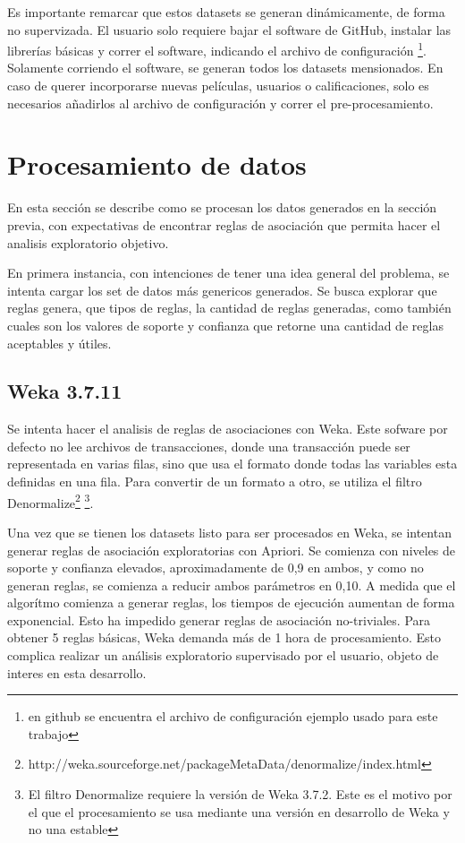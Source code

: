 \documentclass[journal]{IEEEtran}
\begin{document}
Es importante remarcar que estos datasets se generan dinámicamente, de forma 
no supervizada. El usuario solo requiere bajar el software de GitHub, instalar
las librerías básicas y correr el software, indicando el archivo de configuración
\footnote{en github se encuentra el archivo de configuración ejemplo usado para este trabajo}. 
Solamente corriendo el software, se generan todos los datasets mensionados.  En caso de
querer incorporarse nuevas películas, usuarios o calificaciones, solo es necesarios
añadirlos al archivo de configuración y correr el pre-procesamiento.





\section{Procesamiento de datos}
En esta sección se describe como se procesan los datos generados en la sección
previa, con expectativas de encontrar reglas de asociación que permita hacer el
analisis exploratorio objetivo.

En primera instancia, con intenciones de tener una idea general del problema,
se intenta cargar los set de datos más genericos generados. Se busca explorar
que reglas genera, que tipos de reglas, la cantidad de reglas generadas, como
también cuales son los valores de soporte y confianza que retorne una cantidad
de reglas aceptables y útiles. 

\subsection{Weka 3.7.11}
Se intenta hacer el analisis de reglas de asociaciones con Weka. Este sofware por defecto
no lee archivos de transacciones, donde una transacción puede ser representada en varias filas,
 sino que usa el formato donde todas las variables esta definidas en una fila. Para convertir
de un formato a otro, se utiliza el filtro 
Denormalize\footnote{http://weka.sourceforge.net/packageMetaData/denormalize/index.html}
\footnote{El filtro Denormalize requiere la versión de Weka 3.7.2. Este es el motivo por el que 
el procesamiento se usa mediante una versión en desarrollo de Weka y no una estable}. 

Una vez que se tienen los datasets listo para ser procesados en Weka, se intentan generar reglas
de asociación exploratorias con Apriori. Se comienza con niveles de soporte y confianza elevados,
aproximadamente de 0,9 en ambos, y como no generan reglas, se comienza a reducir ambos parámetros
en 0,10. A medida que el algorítmo comienza a generar reglas, los tiempos de ejecución aumentan
de forma exponencial. Esto ha impedido generar reglas de asociación no-triviales. Para obtener
5 reglas básicas, Weka demanda más de 1 hora de procesamiento. Esto complica realizar un análisis
exploratorio supervisado por el usuario, objeto de interes en esta desarrollo.
\end{document}
